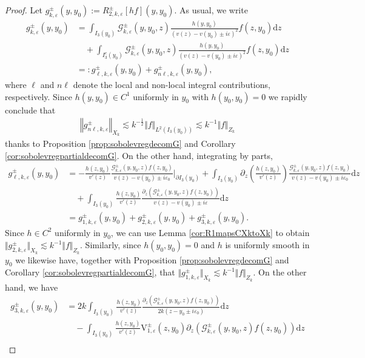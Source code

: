 \documentclass[11pt,reqno]{amsproc}
\theoremstyle{definition}
\numberwithin{equation}{section}
\newcommand{\G}{{\mathcal{G}}}
\renewcommand{\d}{\mathrm{d}}
\newcommand{\ep}{\varepsilon}
\begin{document}
\begin{proof}
Let $g_{k,\ep}^\pm(y,y_0):= R_{2,k,\ep}^\pm[h f](y,y_0)$. As usual, we write
\begin{align*}
g_{k,\ep}^\pm(y,y_0) &= \int_{I_3(y_0)} \G_{k,\ep}^\pm (y,y_0,z) \frac{h(y,y_0)}{(v(z) - v(y_0) \pm i\ep)^2} f(z,y_0) \d z \\
&\quad + \int_{I_3^c(y_0)} \G_{k,\ep}^\pm (y,y_0,z) \frac{h(y,y_0)}{(v(z) - v(y_0) \pm i\ep)^2} f(z,y_0) \d z \\
&=:g_{\ell,k,\ep}^\pm(y,y_0) + g_{n\ell,k,\ep}^\pm(y,y_0),
\end{align*}
where $\ell$ and $n\ell$ denote the local and non-local integral contributions, respectively. Since $h(y,y_0)\in C^1$ uniformly in $y_0$ with $h(y_0,y_0) = 0$ we rapidly conclude that 
\begin{align*}
\left\Vert g_{n\ell,k,\ep}^\pm  \right\Vert_{X_k}\lesssim k^{-\frac12}\Vert f \Vert_{L^2(I_3(y_0))} \lesssim   k^{-1}\Vert f \Vert_{Z_k}
\end{align*}
thanks to Proposition \ref{prop:sobolevregdecomG} and Corollary \ref{cor:sobolevregpartialdecomG}. On the other hand, integrating by parts,
\begin{align*}
g_{\ell,k,\ep}^\pm(y,y_0) &=  -\frac{h(z,y_0)}{v'(z)} \frac{\G_{k,\ep}^\pm(y,y_0,z) f(z,y_0)}{v(z) - v(y_0) \pm i\ep_0} \Big|_{\partial I_3(y_0)}  +\int_{I_3(y_0)} \partial_z \left( \frac{h(z,y_0)}{v'(z)} \right) \frac{\G_{k,\ep}^\pm(y,y_0,z) f(z,y_0)}{v(z) - v(y_0) \pm i\ep_0} \d z \\
&\quad+ \int_{I_3(y_0)} \frac{h(z,y_0)}{v'(z)}\frac{\partial_z \left( \G_{k,\ep}^\pm(y,y_0,z) f(z, y_0) \right)}{v(z) - v(y_0) \pm i\ep} \d z \\
&=g_{1,k,\ep}^\pm(y,y_0) + g_{2,k,\ep}^\pm (y,y_0) + g_{3,k,\ep}^\pm (y,y_0).
\end{align*}
Since $h\in C^2$ uniformly in $y_0$, we can use Lemma \ref{cor:R1mapsCXktoXk} to obtain $\Vert g_{2,k,\ep}^\pm \Vert_{X_k}\lesssim k^{-1}\Vert f \Vert_{Z_k}$. Similarly, since $h(y_0,y_0)=0$ and $h$ is uniformly smooth in $y_0$ we likewise have, together with Proposition \ref{prop:sobolevregdecomG} and Corollary \ref{cor:sobolevregpartialdecomG}, that $\Vert g_{1,k,\ep}^\pm \Vert_{X_k}\lesssim k^{-1}\Vert f \Vert_{Z_k}$. On the other hand, we have
\begin{align*}
g_{3,k,\ep}^\pm(y,y_0) &= 2k\int_{I_3(y_0)} \frac{h(z,y_0)}{v'(z)}\frac{\partial_z \left( \G_{k,\ep}^\pm(y,y_0,z) f(z, y_0) \right)}{2k(z-y_0\pm i\ep_0)} \d z \\
&\quad -\int_{I_3(y_0)} \frac{h(z,y_0)}{v'(z)} \mathrm{V}_{1,\ep}^\pm(z,y_0)\partial_z \left( \G_{k,\ep}^\pm(y,y_0,z) f(z, y_0) \right) \d z \\

\end{align*}
\end{proof}
\end{document}
